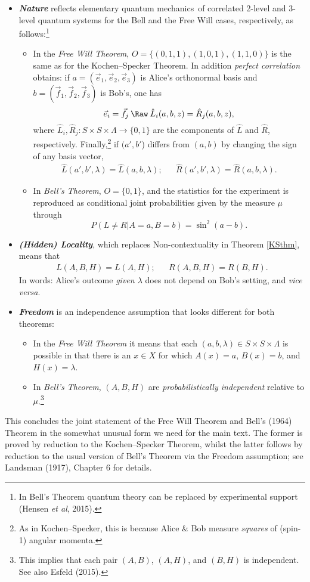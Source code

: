 \documentclass[12pt]{article}
\numberwithin{equation}{section}
\newcommand{\hi}[1]{\emph{\textbf{#1}}}
\newcommand{\qm}{quantum mechanics}
\newcommand{\raw}{\rightarrow}
\newcommand{\x}{\times}
\newcommand{\lm}{\lambda} \newcommand{\Lm}{\Lambda}
\begin{document}
\begin{itemize}
  \item \hi{Nature}  reflects elementary \qm\ of correlated 2-level and 3-level quantum systems for the Bell and the Free Will cases, respectively, as follows:\footnote{In Bell's Theorem quantum theory can be replaced by experimental support (Hensen  \emph{et al}, 2015). }
   \begin{itemize}
\item  In the \emph{Free Will Theorem},  $O=\{(0,1,1), (1,0,1), (1,1,0)\}$ is the same as for the Kochen--Specker Theorem. In addition  \emph{perfect correlation} obtains: if $a=(\vec{e}_1,\vec{e}_2,\vec{e}_3)$ is Alice's orthonormal basis
and  $b=(\vec{f}_1,\vec{f}_2,\vec{f}_3)$ is Bob's, one has
 \begin{equation}
\vec{e}_i=\vec{f}_j\: \Raw\: \hat{L}_i(a,b,z)=\hat{R}_j(a,b,z), \label{ienj}
\end{equation}
where $\hat{L}_i, \hat{R}_j: S \x S\x \Lm\raw \{0,1\}$ are the components of $\hat{L}$ and $\hat{R}$, respectively.  Finally,\footnote{As in Kochen--Specker, this is because Alice \& Bob measure \emph{squares} of (spin-1) angular momenta.} if $(a',b'$) differs from $(a,b)$ by changing the sign of any  basis vector,
 \begin{align}
\hat{L}(a',b',\lm)=\hat{L}(a,b,\lm); && 
\hat{R}(a',b',\lm)=\hat{R}(a,b,\lm).
\end{align}
\item In \emph{Bell's Theorem}, $O=\{0,1\}$, and the statistics for the experiment is reproduced as conditional joint probabilities given by the measure $\mu$ through
\begin{equation}
P(L\neq R|A=a,B=b)=\sin^2(a-b).\label{uitkomstAspect2} 
\end{equation}
\end{itemize}
\item \hi{(Hidden)  Locality}, which replaces Non-contextuality in Theorem \ref{KSthm}, means that 
\begin{align}
L(A,B,H)=L(A,H); && R(A,B,H)=R(B,H).
\end{align} In words: Alice's outcome \emph{given $\lm$} does not depend on Bob's setting, and \emph{vice versa}. 
\item  \hi{Freedom} is an independence assumption that looks different for both theorems:
\begin{itemize}
\item In the \emph{Free Will Theorem} it means  that  each $(a,b,\lm)\in S\x S\x \Lm$ is possible in that there is an $x\in X$  for which $A(x)=a$, $B(x)=b$, and $H(x)=\lm$.
\item In  \emph{Bell's Theorem},  $(A,B,H)$ are \emph{probabilistically independent} relative to $\mu$.\footnote{This implies  that each pair $(A,B)$, $(A,H)$, and $(B,H)$ is independent. See also Esfeld (2015).}
\end{itemize}
  \end{itemize}
This concludes the joint statement of the Free Will Theorem and Bell's (1964) Theorem in the somewhat unusual form we need for the main text. The former is proved by reduction to the Kochen--Specker Theorem, whilst the latter follows by reduction to the usual version of Bell's Theorem via the Freedom assumption; see Landsman (1917), Chapter 6 for details. 
\end{document}
